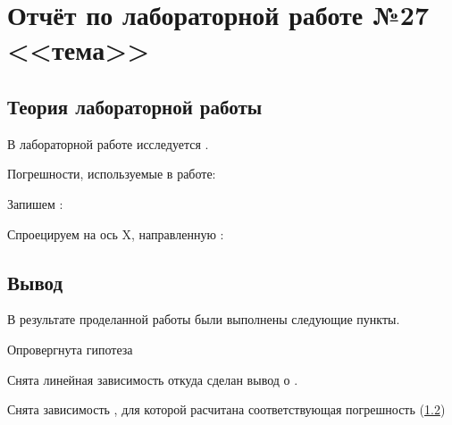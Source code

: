 
\newcommand{\labauthors}{Сарафанов Ф.Г., Сидоров Д.А.}
\newcommand{\labnumber}{27}
\newcommand{\labtheme}{тема}

\newcommand{\ddt}{$\ \pm\ 0.2\ \text{с}$}
\newcommand{\ddtv}{$\ \pm\ 0.8\ \text{с}$}
\newcommand{\ddh}{$\ \pm\ 0.1\ \text{см}$}
\newcommand{\dm}{\Delta{}m}
\newcommand{\Dh}{\Delta{}x}
\newcommand{\Dl}{\Delta{}(\lambda)}
\newcommand{\dmsr}{<\Delta{}m>}
\newcommand{\el}{\varepsilon(\lambda)}




\section{Отчёт по лабораторной работе №\labnumber \\ <<\labtheme>>}

% 
\subsection{Теория лабораторной работы}

В лабораторной работе исследуется .

Погрешности, используемые в работе: 

Запишем :
\begin{EqSystem}
\end{EqSystem}

Спроецируем на ось X, направленную :
\begin{EqSystem}
	\label{eq:}
\end{EqSystem}

\subsection{Вывод}

В результате проделанной работы были выполнены следующие пункты.

Опровергнута гипотеза 

Снята линейная зависимость  откуда сделан вывод о .

Снята зависимость ,
для которой расчитана соответствующая погрешность (\ref{})

